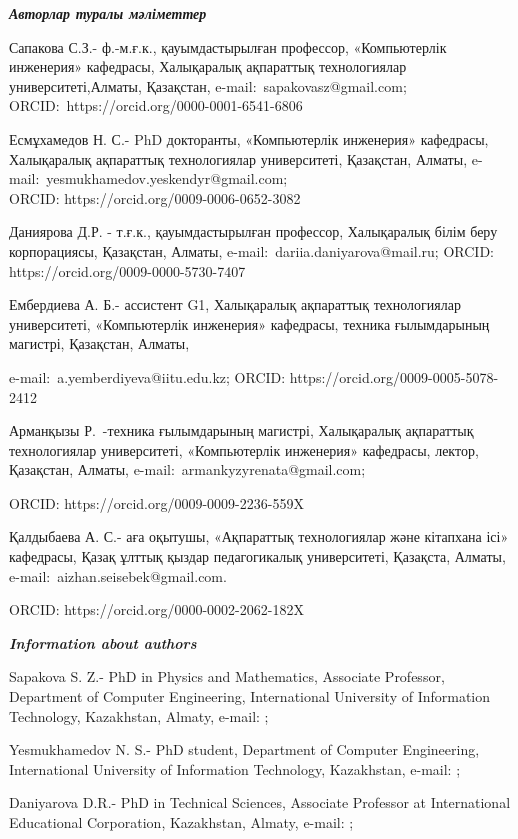 \begin{authorinfo}
\emph{{\bfseries Авторлар туралы мәліметтер}}

Сапакова С.З.- ф.-м.ғ.к., қауымдастырылған профессор, «Компьютерлік
инженерия» кафедрасы, Халықаралық ақпараттық технологиялар
университеті,Алматы, Қазақстан, e-mail:~sapakovasz@gmail.com;
ORCID:~https://orcid.org/0000-0001-6541-6806

Есмұхамедов Н. С.- PhD докторанты, «Компьютерлік инженерия» кафедрасы,
Халықаралық ақпараттық технологиялар университеті, Қазақстан, Алматы,
e-mail:~yesmukhamedov.yeskendyr@gmail.com;\\
ORCID: https://orcid.org/0009-0006-0652-3082

Даниярова Д.Р. - т.ғ.к., қауымдастырылған профессор, Халықаралық білім
беру корпорациясы, Қазақстан, Алматы, e-mail:~dariia.daniyarova@mail.ru;
ORCID: https://orcid.org/0009-0000-5730-7407

Ембердиева А. Б.- ассистент G1, Халықаралық ақпараттық технологиялар
университеті, «Компьютерлік инженерия» кафедрасы, техника ғылымдарының
магистрі, Қазақстан, Алматы,

e-mail:~a.yemberdiyeva@iitu.edu.kz; ORCID:
https://orcid.org/0009-0005-5078-2412

Арманқызы Р.~-техника ғылымдарының магистрі, Халықаралық ақпараттық
технологиялар университеті, «Компьютерлік инженерия» кафедрасы, лектор,
Қазақстан, Алматы, e-mail:~armankyzyrenata@gmail.com;

ORCID: https://orcid.org/0009-0009-2236-559X

Қалдыбаева А. С.- аға оқытушы, «Ақпараттық технологиялар және кітапхана
ісі» кафедрасы, Қазақ ұлттық қыздар педагогикалық университеті,
Қазақста, Алматы, e-mail:~aizhan.seisebek@gmail.com.

ORCID: https://orcid.org/0000-0002-2062-182X

\emph{{\bfseries Information about authors}}

Sapakova S. Z.- PhD in Physics and Mathematics, Associate Professor,
Department of Computer Engineering, International University of
Information Technology, Kazakhstan, Almaty, e-mail:
\href{mailto:sapakovasz@gmail.com}{};

Yesmukhamedov N. S.- PhD student, Department of Computer Engineering,
International University of Information Technology, Kazakhstan, e-mail:
\href{mailto:yesmukhamedov.yeskendyr@gmail.com}{};

Daniyarova D.R.- PhD in Technical Sciences, Associate Professor at
International Educational Corporation, Kazakhstan, Almaty, e-mail:
\href{mailto:dariia.daniyarova@mail.ru}{};


\end{authorinfo}
